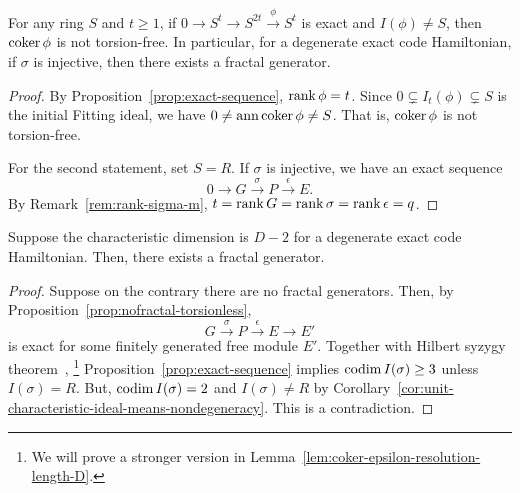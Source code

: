 \begin{prop}
For any ring $S$ and $t \ge 1$,
if $0 \to S^t \to S^{2t} \xrightarrow{\phi} S^t$ is exact and $I(\phi) \ne S$,
then $\mathop{\mathrm{coker}}\nolimits \phi$ is not torsion-free.
In particular,
for a degenerate exact code Hamiltonian,
if $\sigma$ is injective, then there exists a fractal generator.
\label{prop:injective-sigma-implies-fractal}
\end{prop}
\begin{proof}
By Proposition~\ref{prop:exact-sequence}, $\mathop{\mathrm{rank}}\nolimits \phi = t$.
Since $0 \subsetneq I_t(\phi) \subsetneq S$ is the initial Fitting ideal,
we have $0 \ne \mathop{\mathrm{ann}}\nolimits \mathop{\mathrm{coker}}\nolimits \phi \ne S$. That is, $\mathop{\mathrm{coker}}\nolimits \phi$ is not torsion-free.

For the second statement, set $S=R$.
If $\sigma$ is injective, we have an exact sequence
\[
 0 \to G \xrightarrow{\sigma} P \xrightarrow{\epsilon} E .
\]
By Remark~\ref{rem:rank-sigma-m}, $t = \mathop{\mathrm{rank}}\nolimits G = \mathop{\mathrm{rank}}\nolimits \sigma = \mathop{\mathrm{rank}}\nolimits \epsilon = q$.
\end{proof}

\begin{prop}
Suppose the characteristic dimension is $D-2$
for a degenerate exact code Hamiltonian.
Then, there exists a fractal generator.
\label{prop:maximal-characteristic-dimension-means-fractal}
\end{prop}
\begin{proof}
Suppose on the contrary there are no fractal generators.
Then, by Proposition~\ref{prop:nofractal-torsionless},
\[
 G \xrightarrow{\sigma} P \xrightarrow{\epsilon} E \to E'
\]
is exact for some finitely generated free module $E'$.
Together with Hilbert syzygy theorem~\cite[Corollary~15.11]{Eisenbud},%
\footnote{We will prove a stronger version in Lemma~\ref{lem:coker-epsilon-resolution-length-D}.}
Proposition~\ref{prop:exact-sequence} implies
$\mathop{\mathrm{codim}}\nolimits I(\sigma) \ge 3$ unless $I(\sigma) = R$.
But, $\mathop{\mathrm{codim}}\nolimits I(\sigma) = 2$ and $I(\sigma) \ne R$ by 
Corollary~\ref{cor:unit-characteristic-ideal-means-nondegeneracy}.
This is a contradiction.
\end{proof}

